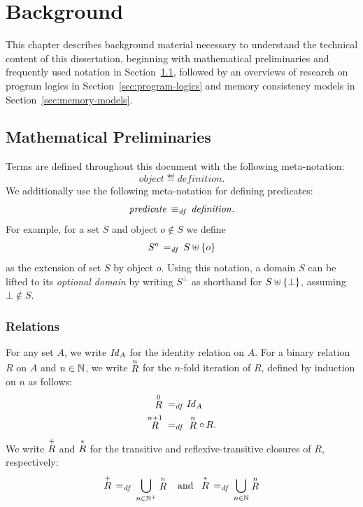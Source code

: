 \documentclass[11pt]{report}         %
\begin{document}
\chapter{Background}
\label{ch:background}

This chapter describes background material necessary to understand the technical content of this dissertation, beginning with mathematical preliminaries and frequently used notation in Section~\ref{sec:preliminaries}, followed by an overviews of research on program logics in Section~\ref{sec:program-logics} and memory consistency models in Section~\ref{sec:memory-models}. 

\section{Mathematical Preliminaries}
\label{sec:preliminaries}

Terms are defined throughout this document with the following meta-notation: \[ \mathit{object} \eqdef \mathit{definition}.\] We additionally use the following meta-notation for defining predicates: \[ \mathit{predicate} \iffdef \mathit{definition}.\] For example, for a set $S$ and object $o \notin S$ we define \[S^o \eqdef S \uplus \set{o}\] as the extension of set $S$ by object $o$. Using this notation, a domain $S$ can be lifted to its \emph{optional domain} by writing $S^\bot$ as shorthand for $S \uplus \set{\bot}$, assuming $\bot \notin S$. 

\subsection{Relations}
\label{sec:relations}

For any set $A$, we write $\ident{A}$ for the identity relation on $A$. For a binary relation $R$ on $A$ and $n \in \setnaturals$, we write $\relexp{R}{n}$ for the $n$-fold iteration of $R$, defined by induction on $n$ as follows: \begin{align*} \relexp{R}{0} \eqdef &\ident{A} \\ 
\relexp{R}{n+1} \eqdef & \relexp{R}{n} \rcomp R.\end{align*} We write $\tcl{R}$ and $\rtcl{R}$ for the transitive and reflexive-transitive closures of $R$, respectively: \begin{align*}
    \tcl{R} \eqdef \bigcup_{n \in \setpositives} \relexp{R}{n} \andif
    \rtcl{R} \eqdef \bigcup_{n \in \setnaturals} \relexp{R}{n} 
\end{align*}
\end{document}
